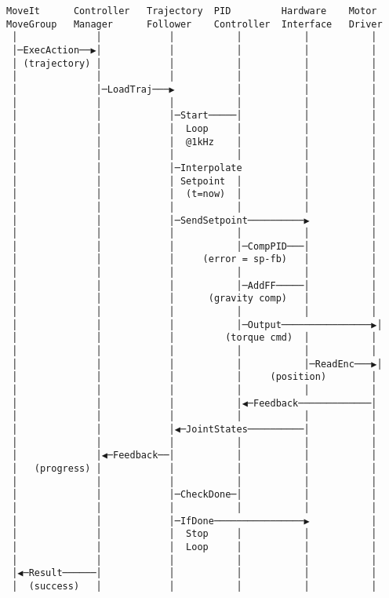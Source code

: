 \documentclass[
]{article}
\begin{document}
\begin{verbatim}
MoveIt      Controller   Trajectory  PID         Hardware    Motor
MoveGroup   Manager      Follower    Controller  Interface   Driver
 │              │            │           │           │           │
 │─ExecAction──▶│            │           │           │           │
 │ (trajectory) │            │           │           │           │
 │              │            │           │           │           │
 │              │─LoadTraj───▶           │           │           │
 │              │            │           │           │           │
 │              │            │─Start─────│           │           │
 │              │            │  Loop     │           │           │
 │              │            │  @1kHz    │           │           │
 │              │            │           │           │           │
 │              │            │─Interpolate           │           │
 │              │            │ Setpoint  │           │           │
 │              │            │  (t=now)  │           │           │
 │              │            │           │           │           │
 │              │            │─SendSetpoint──────────▶           │
 │              │            │           │           │           │
 │              │            │           │─CompPID───│           │
 │              │            │     (error = sp-fb)   │           │
 │              │            │           │           │           │
 │              │            │           │─AddFF─────│           │
 │              │            │      (gravity comp)   │           │
 │              │            │           │           │           │
 │              │            │           │─Output────────────────▶│
 │              │            │         (torque cmd)  │           │
 │              │            │           │           │           │
 │              │            │           │           │─ReadEnc───▶│
 │              │            │           │     (position)        │
 │              │            │           │           │           │
 │              │            │           │◀─Feedback─────────────│
 │              │            │           │           │           │
 │              │            │◀─JointStates──────────│           │
 │              │            │           │           │           │
 │              │◀─Feedback──│           │           │           │
 │   (progress) │            │           │           │           │
 │              │            │           │           │           │
 │              │            │─CheckDone─│           │           │
 │              │            │           │           │           │
 │              │            │─IfDone────────────────▶           │
 │              │            │  Stop     │           │           │
 │              │            │  Loop     │           │           │
 │              │            │           │           │           │
 │◀─Result──────│            │           │           │           │
 │  (success)   │            │           │           │           │
\end{verbatim}
\end{document}
